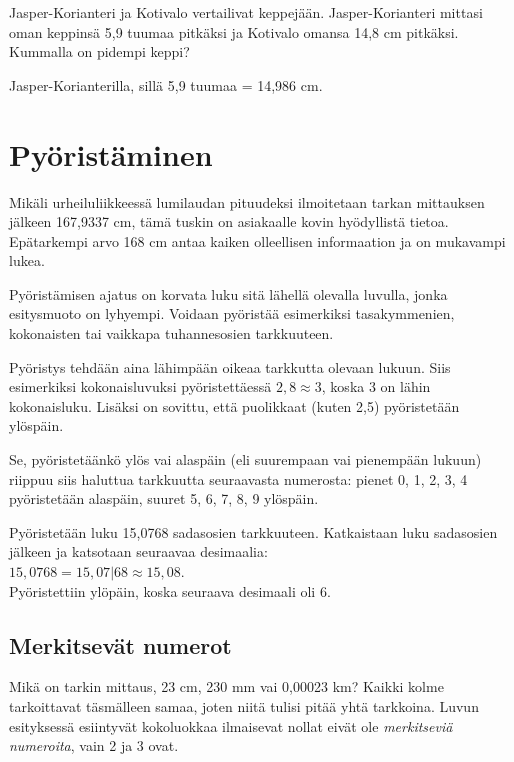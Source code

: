 \begin{tehtava}
Jasper-Korianteri ja Kotivalo vertailivat keppejään. Jasper-Korianteri mittasi oman keppinsä 5,9 tuumaa pitkäksi ja Kotivalo omansa 14,8 cm pitkäksi. Kummalla on pidempi keppi?
\begin{vastaus}
Jasper-Korianterilla, sillä 5,9 tuumaa = 14,986 cm.
\end{vastaus}
\end{tehtava}

\section*{Pyöristäminen}

Mikäli urheiluliikkeessä lumilaudan pituudeksi ilmoitetaan tarkan mittauksen jälkeen 167,9337 cm, tämä tuskin on asiakaalle kovin hyödyllistä tietoa. Epätarkempi arvo 168 cm antaa kaiken olleellisen informaation ja on mukavampi lukea.

Pyöristämisen ajatus on korvata luku sitä lähellä olevalla luvulla, jonka esitysmuoto on lyhyempi. Voidaan pyöristää
esimerkiksi tasakymmenien, kokonaisten tai vaikkapa tuhannesosien
tarkkuuteen.

Pyöristys tehdään aina lähimpään oikeaa tarkkutta olevaan lukuun. Siis esimerkiksi kokonaisluvuksi pyöristettäessä $2,8 \approx 3$, koska 3 on lähin kokonaisluku. Lisäksi on sovittu, että
puolikkaat (kuten 2,5) pyöristetään ylöspäin.

Se, pyöristetäänkö ylös vai alaspäin (eli suurempaan vai
pienempään lukuun) riippuu siis haluttua tarkkuutta
seuraavasta numerosta: pienet
0, 1, 2, 3, 4 pyöristetään alaspäin, suuret 5, 6, 7, 8, 9 ylöspäin.

\begin{esimerkki}
Pyöristetään luku 15,0768 sadasosien tarkkuuteen. Katkaistaan
luku sadasosien jälkeen ja katsotaan seuraavaa desimaalia:\\
$15,0768 = 15,07|68 \approx 15,08$.\\
Pyöristettiin ylöpäin, koska seuraava desimaali oli 6.
\end{esimerkki}

\subsection*{Merkitsevät numerot}

Mikä on tarkin mittaus, 23 cm, 230 mm vai 0,00023 km? Kaikki kolme tarkoittavat täsmälleen samaa, joten niitä tulisi pitää
yhtä tarkkoina. Luvun esityksessä esiintyvät kokoluokkaa ilmaisevat nollat eivät ole \emph{merkitseviä numeroita}, vain
2 ja 3 ovat.

